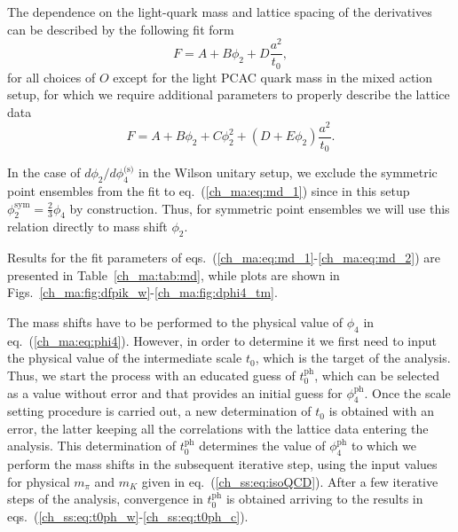 The dependence on the light-quark mass and lattice spacing of the derivatives can be described by the following fit form
\begin{equation}
\label{ch_ma:eq:md_1}
F=A+B\phi_2+D\frac{a^2}{t_0},
\end{equation}
for all choices of ${O}$ except for the light PCAC quark mass in the mixed action setup, for which we require additional parameters to properly describe the lattice data
\begin{equation}
\label{ch_ma:eq:md_2}
F=A+B\phi_2+C\phi_2^2+(D+E\phi_2)\frac{a^2}{t_0}.
\end{equation}

In the case of $d\phi_2/d\phi_4^{\textrm{(s)}}$ in the Wilson unitary setup, we exclude the symmetric point ensembles from the fit to eq.~(\ref{ch_ma:eq:md_1}) since in this setup $\phi_2^{\textrm{sym}}=\frac{2}{3}\phi_4$ by construction. Thus, for symmetric point ensembles we will use this relation directly to mass shift $\phi_2$.

Results for the fit parameters of eqs.~(\ref{ch_ma:eq:md_1}-\ref{ch_ma:eq:md_2}) are presented in Table~\ref{ch_ma:tab:md}, while plots are shown in Figs.~\ref{ch_ma:fig:dfpik_w}-\ref{ch_ma:fig:dphi4_tm}.

The mass shifts have to be performed to the physical value of $\phi_4$ in eq.~(\ref{ch_ma:eq:phi4}). However, in order to determine it we first need to input the physical value of the intermediate scale $t_0$, which is the target of the analysis. Thus, we start the process with an educated guess of $t_0^{\textrm{ph}}$, which can be selected as a value without error and that provides an initial guess for $\phi_4^{\textrm{ph}}$. Once the scale setting procedure is carried out, a new determination of $t_0$ is obtained with an error, the latter keeping all the correlations with the lattice data entering the analysis. This determination of $t_0^{\textrm{ph}}$ determines the value of $\phi_4^{\textrm{ph}}$ to which we perform the mass shifts in the subsequent iterative step, using the input values for physical $m_{\pi}$ and $m_K$ given in eq.~(\ref{ch_ss:eq:isoQCD}). After a few iterative steps of the analysis, convergence in $t_0^{\textrm{ph}}$ is obtained arriving to the results in eqs.~(\ref{ch_ss:eq:t0ph_w}-\ref{ch_ss:eq:t0ph_c}).


\newpage

